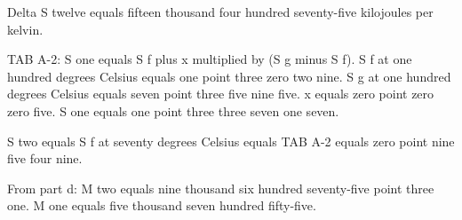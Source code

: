 Delta S twelve equals fifteen thousand four hundred seventy-five kilojoules per kelvin.  

TAB A-2:  
S one equals S f plus x multiplied by (S g minus S f).  
S f at one hundred degrees Celsius equals one point three zero two nine.  
S g at one hundred degrees Celsius equals seven point three five nine five.  
x equals zero point zero zero five.  
S one equals one point three three seven one seven.  

S two equals S f at seventy degrees Celsius equals TAB A-2 equals zero point nine five four nine.  

From part d:  
M two equals nine thousand six hundred seventy-five point three one.  
M one equals five thousand seven hundred fifty-five.